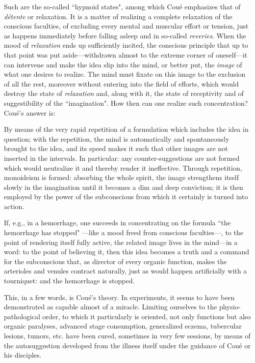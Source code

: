 Such are the so-called ``hypnoid states", among which Coué emphasizes that of \textit{détente} or relaxation. It is a matter of realizing a complete relaxation of the conscious faculties, of excluding every mental and muscular effort or tension, just as happens immediately before falling asleep and in so-called \textit{reveries}. When the mood of \textit{relaxation} ends up sufficiently incited, the conscious principle that up to that point was put aside—withdrawn almost to the extreme corner of oneself—it can intervene and make the idea slip into the mind, or better put, the \textit{image} of what one desires to realize. The mind must fixate on this image to the exclusion of all the rest, moreover without entering into the field of efforts, which would destroy the state of \textit{relaxation} and, along with it, the state of receptivity and of suggestibility of the ``imagination". How then can one realize such concentration? Coué's answer is:

\begin{quotex}
By means of the very rapid repetition of a formulation which includes the idea in question; with the repetition, the mind is automatically and spontaneously brought to the idea, and its speed makes it such that other images are not inserted in the intervals. In particular: any counter-suggestions are not formed which would neutralize it and thereby render it ineffective. Through repetition, monoideism is formed: absorbing the whole spirit, the image strengthens itself slowly in the imagination until it becomes a dim and deep conviction; it is then employed by the power of the subconscious from which it certainly is turned into action. 
\end{quotex}

If, e.g., in a hemorrhage, one succeeds in concentrating on the formula ``the hemorrhage has stopped" —like a mood freed from conscious faculties—, to the point of rendering itself fully active, the related image lives in the mind—in a word: to the point of believing it, then this idea becomes a truth and a command for the subconscious that, as director of every organic function, makes the arterioles and venules contract naturally, just as would happen artificially with a tourniquet: and the hemorrhage is stopped.

This, in a few words, is Coué's theory. In experiments, it seems to have been demonstrated as capable almost of a miracle. Limiting ourselves to the physio-pathological order, to which it particularly is oriented, not only functions but also organic paralyses, advanced stage consumption, generalized eczema, tubercular lesions, tumors, etc. have been cured, sometimes in very few sessions, by means of the autosuggestion developed from the illness itself under the guidance of Coué or his disciples.


